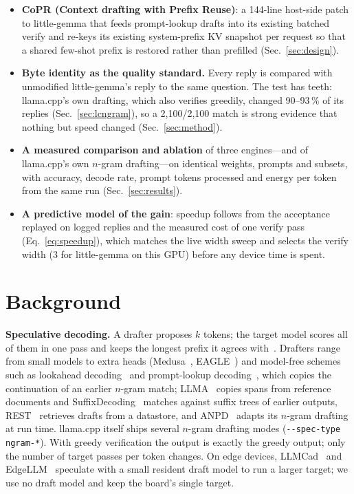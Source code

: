\documentclass[lettersize,journal]{IEEEtran}
\newcommand{\sys}{CoPR}
\newcommand{\lc}{llama.cpp}
\newcommand{\lgm}{little-gemma}
\begin{document}
\begin{itemize}
\item \textbf{\sys{} (Context drafting with Prefix Reuse)}: a 144-line host-side
patch to \lgm{} that feeds prompt-lookup drafts into its existing batched
verify and re-keys its
existing system-prefix KV snapshot per request so that a shared few-shot prefix
is restored rather than prefilled (Sec.~\ref{sec:design}).
\item \textbf{Byte identity as the quality standard.} Every reply is compared
with unmodified \lgm{}'s reply to the same question. The test has teeth: \lc{}'s
own drafting, which also verifies greedily, changed 90--93\,\% of its replies
(Sec.~\ref{sec:lcngram}), so a 2{,}100/2{,}100 match is strong evidence that
nothing but speed changed (Sec.~\ref{sec:method}).
\item \textbf{A measured comparison and ablation} of three engines---and of
\lc{}'s own $n$-gram drafting---on identical
weights, prompts and subsets, with accuracy, decode rate, prompt
tokens processed and energy per token from the same run
(Sec.~\ref{sec:results}).
\item \textbf{A predictive model of the gain}: speedup follows from the
acceptance replayed on logged replies and the measured cost of one verify pass
(Eq.~\ref{eq:speedup}), which matches the live width sweep and selects the
verify width (3 for \lgm{} on this GPU) before any device time is spent.
\end{itemize}

\section{Background}

\textbf{Speculative decoding.} A drafter proposes $k$ tokens; the target model
scores all of them in one pass and keeps the longest prefix it agrees
with~\cite{leviathan2023,chen2023}. Drafters range from small models to extra
heads (Medusa~\cite{medusa}, EAGLE~\cite{eagle}) and model-free schemes such as
lookahead decoding~\cite{lookahead} and prompt-lookup decoding~\cite{pld}, which
copies the continuation of an earlier $n$-gram match; LLMA~\cite{llma} copies
spans from reference documents and SuffixDecoding~\cite{suffixdecoding} matches
against suffix trees of earlier outputs, REST~\cite{rest} retrieves drafts from
a datastore, and ANPD~\cite{anpd} adapts its $n$-gram drafting at run time.
\lc{} itself ships several $n$-gram drafting modes
(\texttt{-{}-spec-type ngram-*}). With greedy verification
the output is exactly the greedy output; only the number of target passes per
token changes. On edge devices, LLMCad~\cite{llmcad} and EdgeLLM~\cite{edgellm}
speculate with a small resident draft model to run a larger target; we use no
draft model and keep the board's single target.
\end{document}
